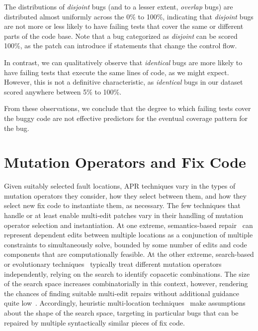 \documentclass[10pt, conference]{IEEEtran}
\begin{document}
The distributions of \emph{disjoint} bugs (and to a lesser extent, \emph{overlap} bugs) are 
distributed almost uniformly across the 0\% to 100\%, indicating that \emph{disjoint} bugs are 
not more or less likely to have failing tests that cover the same or different parts of the code 
base. Note that a bug categorized as \emph{disjoint} can be scored 100\%, as the 
patch can introduce if statements that change the control flow.

In contrast, we can qualitatively observe that \emph{identical} bugs are more likely to have 
failing tests that execute the same lines of code, as we might expect. However, this is not a 
definitive characteristic, as \emph{identical} bugs in our dataset scored anywhere between 
5\% to 100\%.

From these observations, we conclude that the degree to which failing tests cover the buggy 
code are not effective predictors for the eventual coverage pattern for the bug. 


\section{Mutation Operators and Fix Code}
\label{sec:mutops}

Given suitably selected fault locations, APR techniques vary in the types of
mutation operators they consider, how they select between them, and how they
select new fix code to instantiate them, as necessary. 
%
The few techniques that handle or at least enable multi-edit patches vary in their
handling of mutation operator selection and instantiation.  At one
extreme, semantics-based repair~\cite{s3,angelix} can represent dependent edits between multiple
locations as a conjunction of multiple constraints to simultaneously solve,
bounded by some number of edits and code components that are computationally feasible. 
At the other extreme, search-based or
evolutionary techniques~\cite{genprog,par} typically treat different mutation
operators independently, relying on the search to 
identify copacetic combinations.  The size of
the search space increases combinatorially in this context, however, rendering
the chances of finding suitable multi-edit repairs without additional guidance
quite low~\cite{ae,long-search-spaces}. Accordingly, heuristic multi-location
techniques~\cite{saha2019harnessing} make assumptions about the 
shape of the search space, 
targeting in particular bugs that can be repaired by multiple syntactically similar pieces of
fix code.
\end{document}
